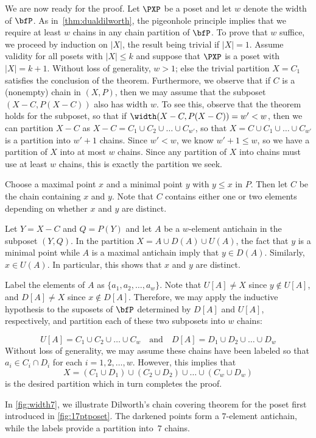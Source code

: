 We are now ready for the proof.  Let $\PXP$ be a poset and let $w$ denote
the width of $\bfP$.
As in~\autoref{thm:dualdilworth}, the pigeonhole principle implies
that we require at least $w$ chains in any chain partition of
$\bfP$. To prove that $w$ suffice, we
proceed by induction on $|X|$, the result being trivial if
$|X|=1$. Assume validity for all posets with $|X|\le k$ and suppose
that $\PXP$ is a poset with $|X|=k+1$. Without loss of generality,
$w>1$; else the trivial partition $X=C_1$ satisfies the
conclusion of the theorem. Furthermore, we observe that if $C$ is a
(nonempty) chain in $(X,P)$, then we may assume that the subposet
$(X-C,P(X-C))$ also has width $w$. To see this, observe that the
theorem holds for the subposet, so that if
$\width(X-C,P(X-C))=w'<w$, then we can partition $X-C$ as
$X-C=C_1\cup C_2\cup\dots\cup C_{w'}$, so that $X=C\cup
C_1\cup\dots\cup C_{w'}$ is a partition into $w'+1$ chains. Since
$w'<w$, we know $w'+1\le w$, so we have a partition of $X$ into at
most $w$ chains. Since any partition of $X$ into chains must use at
least $w$ chains, this is exactly the partition we seek.

Choose a maximal point $x$ and a minimal point $y$ with $y\le x$ in
$P$. Then let $C$ be the chain containing $x$ and $y$. Note that
$C$ contains either one or two elements depending on whether $x$
and $y$ are distinct.

Let $Y=X-C$ and  $Q=P(Y)$ and let $A$ be a $w$-element antichain
in the  subposet $(Y,Q)$.  In the partition $X=A\cup D(A)\cup U(A)$, the
fact that $y$ is a minimal point while $A$ is a maximal
antichain imply that $y\in D(A)$.  Similarly, $x\in U(A)$.  In particular,
this shows that $x$ and $y$ are distinct.

Label the elements of $A$ as
$\{a_1,a_2,\dots,a_w\}$. Note
that $U[A]\ne X$ since $y\notin U[A]$, and $D[A]\ne X$ since
$x\notin D[A]$. Therefore, we may apply the inductive hypothesis to
the suposets of $\bfP$ determined by $D[A]$ and $U[A]$, respectively,
and partition each of these two subposets into $w$ chains: 

\[
U[A]= C_1\cup C_2\cup\dots\cup C_w\quad\text{and}\quad
 D[A]=D_1\cup D_2\cup\dots\cup D_w
\]
Without loss of generality, we may assume these chains have
been labeled so that $a_i\in C_i\cap D_i$ for each $i=1,2,\dots,w$. 
However, this implies that 
\[
X=(C_1\cup D_1)\cup (C_2\cup D_2)\cup\dots\cup(C_w\cup D_w)
\]
is the desired partition which in turn completes the proof.

In \autoref{fig:width7}, we illustrate Dilworth's chain covering
theorem for the poset first introduced in \autoref{fig:17ptposet}.
The darkened points form a $7$-element antichain, while the labels
provide a partition into~$7$ chains.

